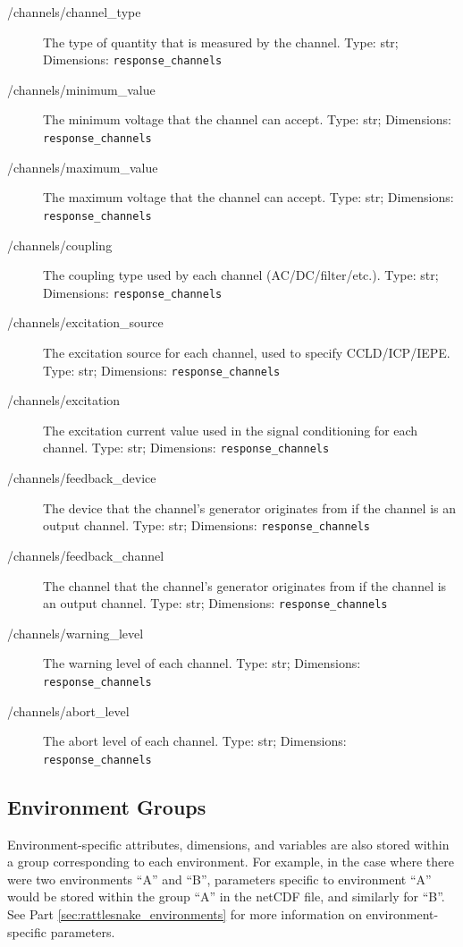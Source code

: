 \documentclass[pdf,12pt,report]{SANDreport}
\newcommand{\inlineCode}{\lstinline[basicstyle=\bfseries\ttfamily]}
\begin{document}
\begin{description}
        \item[/channels/channel\_type] The type of quantity that is measured by the channel.  Type: str; Dimensions: \inlineCode{response_channels}
        \item[/channels/minimum\_value] The minimum voltage that the channel can accept.  Type: str; Dimensions: \inlineCode{response_channels}
        \item[/channels/maximum\_value] The maximum voltage that the channel can accept.  Type: str; Dimensions: \inlineCode{response_channels}
        \item[/channels/coupling] The coupling type used by each channel (AC/DC/filter/etc.).  Type: str; Dimensions: \inlineCode{response_channels}
        \item[/channels/excitation\_source] The excitation source for each channel, used to specify \ac{CCLD}/\ac{ICP}/\ac{IEPE}.  Type: str; Dimensions: \inlineCode{response_channels}
        \item[/channels/excitation] The excitation current value used in the signal conditioning for each channel.  Type: str; Dimensions: \inlineCode{response_channels}
        \item[/channels/feedback\_device] The device that the channel's generator originates from if the channel is an output channel.  Type: str; Dimensions: \inlineCode{response_channels}
        \item[/channels/feedback\_channel] The channel that the channel's generator originates from if the channel is an output channel.  Type: str; Dimensions: \inlineCode{response_channels}
        \item[/channels/warning\_level] The warning level of each channel.  Type: str; Dimensions: \inlineCode{response_channels}
        \item[/channels/abort\_level] The abort level of each channel.  Type: str; Dimensions: \inlineCode{response_channels}
    \end{description}

    \subsection{Environment Groups}
    Environment-specific attributes, dimensions, and variables are also stored within a group corresponding to each environment.  For example, in the case where there were two environments ``A'' and ``B'', parameters specific to environment ``A'' would be stored within the group ``A'' in the netCDF file, and similarly for ``B''.  See Part \ref{sec:rattlesnake_environments} for more information on environment-specific parameters.
    
\end{document}
